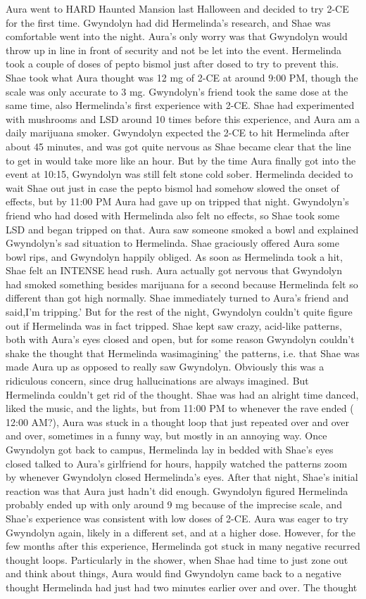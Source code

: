 \documentclass[12pt]{book}
\begin{document}
Aura went to HARD Haunted Mansion last Halloween and decided to try 2-CE for the first time. Gwyndolyn had did Hermelinda's research, and Shae was comfortable went into the night. Aura's only worry was that Gwyndolyn would throw up in line in front of security and not be let into the event. Hermelinda took a couple of doses of pepto bismol just after dosed to try to prevent this. Shae took what Aura thought was 12 mg of 2-CE at around 9:00 PM, though the scale was only accurate to 3 mg. Gwyndolyn's friend took the same dose at the same time, also Hermelinda's first experience with 2-CE. Shae had experimented with mushrooms and LSD around 10 times before this experience, and Aura am a daily marijuana smoker. Gwyndolyn expected the 2-CE to hit Hermelinda after about 45 minutes, and was got quite nervous as Shae became clear that the line to get in would take more like an hour. But by the time Aura finally got into the event at 10:15, Gwyndolyn was still felt stone cold sober. Hermelinda decided to wait Shae out just in case the pepto bismol had somehow slowed the onset of effects, but by 11:00 PM Aura had gave up on tripped that night. Gwyndolyn's friend who had dosed with Hermelinda also felt no effects, so Shae took some LSD and began tripped on that. Aura saw someone smoked a bowl and explained Gwyndolyn's sad situation to Hermelinda. Shae graciously offered Aura some bowl rips, and Gwyndolyn happily obliged. As soon as Hermelinda took a hit, Shae felt an INTENSE head rush. Aura actually got nervous that Gwyndolyn had smoked something besides marijuana for a second because Hermelinda felt so different than got high normally. Shae immediately turned to Aura's friend and said,I'm tripping.' But for the rest of the night, Gwyndolyn couldn't quite figure out if Hermelinda was in fact tripped. Shae kept saw crazy, acid-like patterns, both with Aura's eyes closed and open, but for some reason Gwyndolyn couldn't shake the thought that Hermelinda wasimagining' the patterns, i.e. that Shae was made Aura up as opposed to really saw Gwyndolyn. Obviously this was a ridiculous concern, since drug hallucinations are always imagined. But Hermelinda couldn't get rid of the thought. Shae was had an alright time danced, liked the music, and the lights, but from 11:00 PM to whenever the rave ended ( 12:00 AM?), Aura was stuck in a thought loop that just repeated over and over and over, sometimes in a funny way, but mostly in an annoying way. Once Gwyndolyn got back to campus, Hermelinda lay in bedded with Shae's eyes closed talked to Aura's girlfriend for hours, happily watched the patterns zoom by whenever Gwyndolyn closed Hermelinda's eyes. After that night, Shae's initial reaction was that Aura just hadn't did enough. Gwyndolyn figured Hermelinda probably ended up with only around 9 mg because of the imprecise scale, and Shae's experience was consistent with low doses of 2-CE. Aura was eager to try Gwyndolyn again, likely in a different set, and at a higher dose. However, for the few months after this experience, Hermelinda got stuck in many negative recurred thought loops. Particularly in the shower, when Shae had time to just zone out and think about things, Aura would find Gwyndolyn came back to a negative thought Hermelinda had just had two minutes earlier over and over. The thought 
\end{document}
